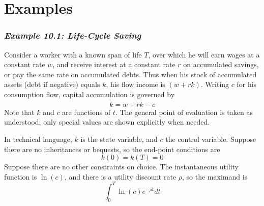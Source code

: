 \section*{Examples}

\subsubsection*{\textit{Example 10.1: Life-Cycle Saving}}

Consider a worker with a known span of life $T$, over which he will earn wages at a constant rate $w$, and receive interest at a constant rate $r$ on accumulated savings, or pay the same rate on accumulated debts. Thus when his stock of accumulated assets (debt if negative) equals $k$, his flow income is $(w+rk)$. Writing $c$ for his consumption flow, capital accumulation is governed by
\begin{equation*}
\dot{k} = w + rk - c
\end{equation*}
Note that $k$ and $c$ are functions of $t$. The general point of evaluation is taken as understood; only special values are shown explicitly when needed.

In technical language, $k$ is the state variable, and $c$ the control variable. Suppose there are no inheritances or bequests, so the end-point conditions are
\begin{equation} \label{equa10.26}
k(0) = k(T) =0
\end{equation}
Suppose there are no other constraints on choice. The instantaneous utility function is $\ln(c)$, and there is a utility discount rate $\rho$, so the maximand is
\begin{equation*}
\int_0^T \ln(c) e^{-\rho t} dt
\end{equation*}


